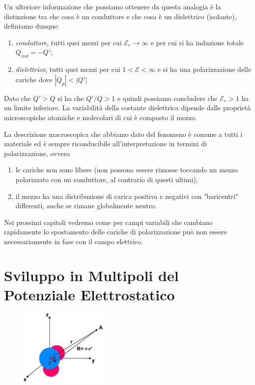 Un ulteriore informazione che possiamo ottenere da questa analogia \`e la distinzione tra che cosa \`e un conduttore e che cosa \`e un dielettrico (isolante), definiamo dunque:
\begin{enumerate}
	\item \textit{conduttore}, tutti quei mezzi per cui $\mathcal{E}_r \to \infty$ e per cui si ha induzione totale $Q_{ind} = - Q'$;
	\item \textit{dielettrico}, tutti quei mezzi per cui $1 < \mathcal{E} < \infty$ e si ha una polarizzazione delle cariche dove $|Q_p| < |Q'|$
\end{enumerate}

Dato che $ Q'> Q$ si ha che $Q'/Q > 1$ e quindi possiamo concludere che $\mathcal{E}_r > 1$ ha un limite inferiore. La variabilit\`a della costante dielettrica dipende dalle propriet\`a microscopiche atomiche e molecolari di cui \`e composto il mezzo. 
\newline

La descrizione macroscopica che abbiamo dato del fenomeno \`e comune a tutti i materiale ed \`e sempre riconducibile all'interpretazione in termini di polarizzazione, ovvero
\begin{enumerate}
	\item le cariche non sono libere (non possono essere rimosse toccando un mezzo polarizzato con un conduttore, al contrario di questi ultimi);
	\item il mezzo ha una distribuzione di carica positiva e negativi con "baricentri" differenti, anche se rimane globalmente neutro.
\end{enumerate}

\begin{remark}
Nei prossimi capitoli vedremo come per campi variabili che cambiano rapidamente lo spostamento delle cariche di polarizzazione pu\`o non essere necessariamente in fase con il campo elettrico.	
\end{remark}

\section{Sviluppo in Multipoli del Potenziale Elettrostatico}

\begin{figure} %
    \centering
    \includegraphics[width=0.38\textwidth]{images/multipolo} %
\end{figure}

